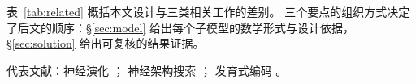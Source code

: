 表~\ref{tab:related} 概括本文设计与三类相关工作的差别。
三个要点的组织方式决定了后文的顺序：\S\ref{sec:model} 给出每个子模型的数学形式与设计依据，
\S\ref{sec:solution} 给出可复核的结果证据。

\begin{table}[H]
  \centering
  \caption{本文设计与相关工作的对照。}
  \label{tab:related}
  \footnotesize
  \setlength{\tabcolsep}{2pt}
  \begin{threeparttable}
  \begin{tablenotes}\footnotesize\raggedright
    \item 代表文献：神经演化 \citep{bib5_miikkulainen2025,bib222_stanley2002,bib223_stanley2009}；
          神经架构搜索 \citep{bib224_elsken2019,bib225_liu2019}；
          发育式编码 \citep{bib1_zador2019,bib2_barabasi2023,bib4_richter2025}。
  \end{tablenotes}
  \end{threeparttable}
\end{table}

